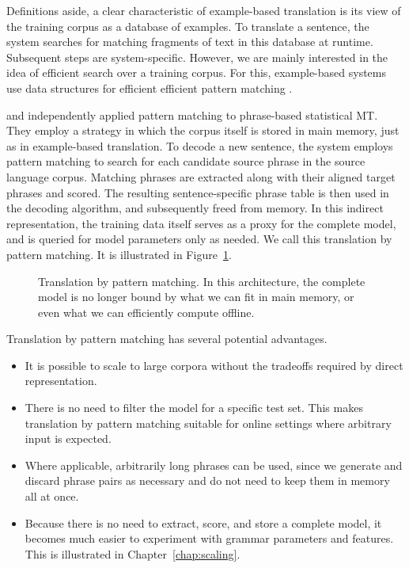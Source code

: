 Definitions aside, a clear characteristic of
example-based translation is its view of the training
corpus as a database of examples.  To translate a sentence,
the system searches for matching fragments of text in this database at runtime.  
Subsequent steps are system-specific.  However, we are mainly
interested in the idea of efficient search over a
training corpus.  For this, example-based systems use data structures for
efficient efficient pattern matching \citep{Brown:2004:amta}. 

\citet{Callison-Burch:2005:acl} and \citet{Zhang:2005:eamt} independently
applied pattern matching to phrase-based statistical MT.  
They employ a strategy in which the corpus itself is stored in 
main memory, just as in example-based translation.
To decode a new sentence, the system employs pattern matching to
search for each candidate source phrase
in the source language corpus.  Matching phrases
are extracted along with their aligned target phrases
and scored. The resulting sentence-specific phrase table is 
then used in the decoding algorithm, and subsequently freed from
memory.  In this indirect representation, the
training data itself serves as a proxy for the complete model, and
is queried for model parameters only as needed.
We call this translation by pattern matching.
It is illustrated in Figure~\ref{fig:pattern-matching-architecture}.

\figpreamble
\begin{figure}
	\figfontsize{
	\begin{center}
		
	\end{center}}
	\figpostamble
	\caption[Translation by pattern matching.]{Translation by pattern matching.  In this architecture, the complete
	model is no longer bound by what we can fit in main memory, or even what we
	can efficiently compute offline.}\label{fig:pattern-matching-architecture}
\end{figure}

Translation by pattern matching has several potential advantages.

\begin{itemize}
	\item It is possible to scale to large corpora without the tradeoffs 
	required by direct representation.

	\item There is no need to filter the model for a specific test set.  This makes
	translation by pattern matching suitable for online settings where arbitrary
	input is expected.

	\item Where applicable, arbitrarily long phrases can be used, since we generate
	and discard phrase pairs as necessary and do not need to keep them in memory all at once.

	\item Because there is no need to extract, score, and store a complete
	model, it becomes much easier to experiment with grammar parameters
	and features. This is illustrated in Chapter~\ref{chap:scaling}.

\end{itemize}

